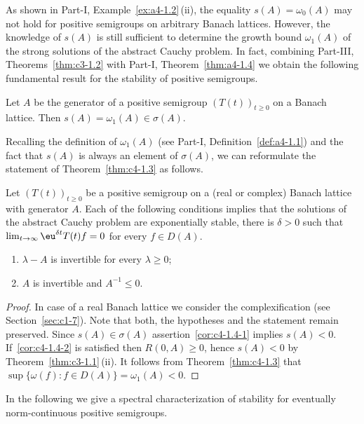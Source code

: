 As shown in Part-I, Example~\ref{ex:a4-1.2}\,(ii), the equality $s(A) = \omega_{0}(A)$ may not hold for positive semigroups on arbitrary Banach lattices.
However, the knowledge of\/ $s(A)$ is still sufficient to determine the growth bound $\omega_{1}(A)$ of the strong solutions of the abstract Cauchy problem.
In fact, combining 
Part-III, Theorems~\ref{thm:c3-1.2}  with 
Part-I, Theorem~\ref{thm:a4-1.4} 
we obtain the following fundamental result for the stability of positive semigroups.
\begin{theorem}\label{thm:c4-1.3}
Let $A$ be the generator of a positive semigroup $(T(t))_{t\geq 0}$ on a Banach lattice.
Then $s(A) = \omega_{1}(A) \in \sigma(A)$.
\end{theorem}
Recalling the definition of\/ $\omega_{1}(A)$ 
(see Part-I, Definition~\ref{def:a4-1.1}) 
and the fact that $s(A)$ is always an element of\/ $\sigma(A)$, we can reformulate the statement of Theorem~\ref{thm:c4-1.3} as follows.
\begin{corollary}\label{cor:c4-1.4}%
Let $(T(t))_{t\geq 0}$ be a positive semigroup on a (real or complex) Banach lattice with generator $A$.
Each of the following conditions implies that the solutions of the abstract Cauchy problem are exponentially stable, \ie  there is $\delta > 0$ such that $\lim_{t \to \infty} \eu^{\delta t}T(t)f = 0$ for every $f \in D(A)$.
\begin{enumerate}[\upshape (i)]
    \item \label{cor:c4-1.4-1}
    $\lambda - A$ is invertible for every $\lambda \geq 0$;
    \item \label{cor:c4-1.4-2}
    $A$ is invertible and $A^{-1} \leq 0$.
    \end{enumerate}
\end{corollary}
\begin{proof}
In case of a real Banach lattice we consider the complexification 
(see Section~\ref{sec:c1-7}).
Note that both, the hypotheses and the statement remain preserved.
Since $s(A) \in \sigma(A)$ assertion~\ref{cor:c4-1.4-1} implies $s(A) < 0$.
If~\ref{cor:c4-1.4-2} is satisfied then $R(0,A) \geq 0$, hence $s(A) < 0$ by Theorem~\ref{thm:c3-1.1}\,(ii).
It follows from Theorem~\ref{thm:c4-1.3} that $\sup\{\omega(f) \colon f \in D(A)\} = \omega_{1}(A) < 0$.
\end{proof}
In the following we give a spectral characterization of stability for eventually norm-continuous positive semigroups.
